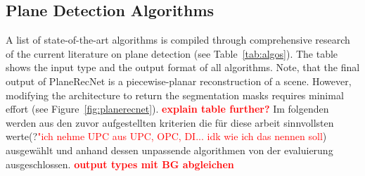 \documentclass[main.tex]{subfiles}
\begin{document}
\subsection{Plane Detection Algorithms}
\label{subsec:pdaselect}
A list of state-of-the-art algorithms is compiled through comprehensive research of the current literature on plane detection (see Table~\ref{tab:algos}).
The table shows the input type and the output format of all algorithms.
Note, that the final output of PlaneRecNet is a piecewise-planar reconstruction of a scene.
However, modifying the architecture to return the segmentation masks requires minimal
effort (see Figure~\ref{fig:planerecnet}).
\textbf{\textcolor{red}{explain table further?}}
Im folgenden werden aus den zuvor aufgestellten kriterien die für diese arbeit sinnvollsten werte(?\textcolor{red}{"ich nehme UPC aus {UPC, OPC, DI}... idk wie ich das nennen soll}) ausgewählt und anhand dessen unpassende algorithmen von der evaluierung ausgeschlossen.
\textbf{\textcolor{red}{output types mit BG abgleichen}}
\end{document}
